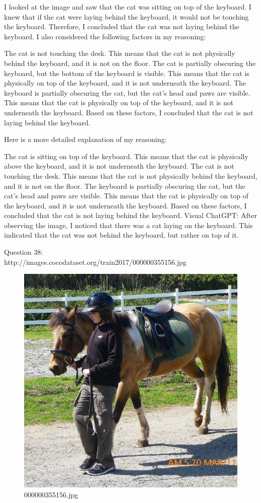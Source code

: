\begin{enumerate}
        I looked at the image and saw that the cat was sitting on top of the keyboard.
        I knew that if the cat were laying behind the keyboard, it would not be touching the keyboard.
        Therefore, I concluded that the cat was not laying behind the keyboard.
        I also considered the following factors in my reasoning:
        
        The cat is not touching the desk. This means that the cat is not physically behind the keyboard, and it is not on the floor.
        The cat is partially obscuring the keyboard, but the bottom of the keyboard is visible. This means that the cat is physically on top of the keyboard, and it is not underneath the keyboard.
        The keyboard is partially obscuring the cat, but the cat's head and paws are visible. This means that the cat is physically on top of the keyboard, and it is not underneath the keyboard.
        Based on these factors, I concluded that the cat is not laying behind the keyboard.
        
        Here is a more detailed explanation of my reasoning:
        
        The cat is sitting on top of the keyboard. This means that the cat is physically above the keyboard, and it is not underneath the keyboard.
        The cat is not touching the desk. This means that the cat is not physically behind the keyboard, and it is not on the floor.
        The keyboard is partially obscuring the cat, but the cat's head and paws are visible. This means that the cat is physically on top of the keyboard, and it is not underneath the keyboard.
        Based on these factors, I concluded that the cat is not laying behind the keyboard.
        \subitem Visual ChatGPT: After observing the image, I noticed that there was a cat laying on the keyboard. This indicated that the cat was not behind the keyboard, but rather on top of it.
    \end{enumerate}
    Question 38:\\http://images.cocodataset.org/train2017/000000355156.jpg
    \begin{figure}[h]
        \centering
        \includegraphics[width=0.8\linewidth]{../image set/easy/000000355156.jpg}
        \caption{000000355156.jpg}
    \end{figure}
